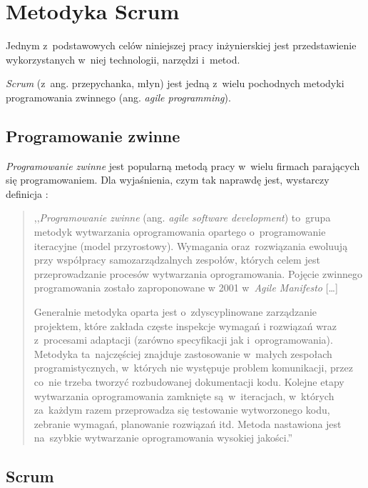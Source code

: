 \section{Metodyka Scrum} \label{scrum}

Jednym z~podstawowych celów niniejszej pracy inżynierskiej jest przedstawienie wykorzystanych w~niej technologii, narzędzi i~metod.


\textit{Scrum} \cite{scrumaliance} (z~ang. przepychanka, młyn) jest jedną z~wielu pochodnych metodyki programowania zwinnego \cite{agile1} (ang. \textit{agile programming}).

\subsection{Programowanie zwinne} \label{scrum.agile}

\textit{Programowanie zwinne} jest popularną metodą pracy w~wielu firmach parających się programowaniem. Dla wyjaśnienia, czym tak naprawdę jest, wystarczy definicja \cite{agile2}:

\begin{quote}
,,\textit{Programowanie zwinne} (ang. \textit{agile software development}) to~grupa metodyk wytwarzania oprogramowania opartego o~programowanie iteracyjne (model przyrostowy). Wymagania oraz~roz\-wią\-za\-nia e\-wo\-lu\-ują przy współpracy samozarządzalnych zespołów, których celem jest przeprowadzanie procesów wytwarzania oprogramowania. Pojęcie zwinnego programowania zostało zaproponowane w 2001 w~\textit{Agile Manifesto} \cite{agile.manifesto}
[\ldots]


Generalnie metodyka oparta jest o~zdyscyplinowane zarządzanie projektem, które zakłada częste inspekcje wymagań i rozwiązań wraz z~procesami adaptacji (zarówno specyfikacji jak i~oprogramowania). Metodyka ta~najczęściej znajduje zastosowanie w~małych zespołach programistycznych, w~których nie występuje problem komunikacji, przez co~nie trzeba tworzyć rozbudowanej dokumentacji kodu. Kolejne etapy wytwarzania oprogramowania zamknięte są~w~iteracjach, w~których za~każdym razem przeprowadza się testowanie wytworzonego kodu, zebranie wymagań, planowanie rozwiązań itd. Metoda nastawiona jest na~szybkie wytwarzanie oprogramowania wysokiej jakości.''
\end{quote}

\subsection{Scrum} \label{scrum.scrum}

